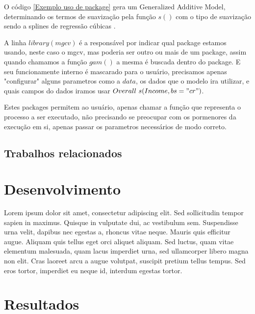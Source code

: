 \documentclass[
	12pt,				%
	openright,			%
	oneside,			%
	a4paper,			%
	english,			%
	brazil				%
	]{abntex2}
\begin{document}
O código \ref{Exemplo uso de package} gera um Generalized Additive Model, determinando os termos de suavização pela função $s()$ com o
tipo de suavização sendo a splines de regressão cúbicas \cite{gam_exemplo}. 

A linha $library(mgcv)$ é a responsável por indicar qual package estamos usando, neste caso o mgcv, mas poderia ser outro ou mais 
de um package, assim quando chamamos a função $gam()$ a mesma é buscada dentro do package. E seu funcionamente interno é mascarado 
para o usuário, precisamos apenas "configurar" alguns parametros como a $data$, os dados que o modelo ira utilizar, e quais campos 
do dados iramos usar $Overall ~ s(Income, bs = "cr")$.  


Estes packages permitem ao usuário, apenas chamar a função que representa o processo a ser executado, não precisando se preocupar com
os pormenores da execução em si, apenas passar os parametros necessários de modo correto.

\section{Trabalhos relacionados}



 \chapter{Desenvolvimento}

 Lorem ipsum dolor sit amet, consectetur adipiscing elit. Sed sollicitudin tempor sapien in maximus. Quisque in vulputate dui, ac vestibulum sem. Suspendisse urna velit, dapibus nec egestas a, rhoncus vitae neque. Mauris quis efficitur augue. Aliquam quis tellus eget orci aliquet aliquam. Sed luctus, quam vitae elementum malesuada, quam lacus imperdiet urna, sed ullamcorper libero magna non elit. Cras laoreet arcu a augue volutpat, suscipit pretium tellus tempus. Sed eros tortor, imperdiet eu neque id, interdum egestas tortor.

 \chapter{Resultados}
\end{document}

